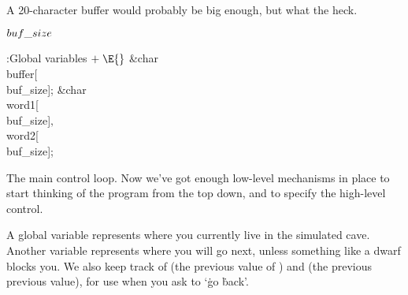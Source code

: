 A 20-character buffer would probably be big enough, but
what the heck.

\Y\B\4\D$\\{buf\_size}$ \5
\par
\Y\B\4:Global variables\X${}\mathrel+\E{}$\6
\&{char} \\{buffer}[\\{buf\_size}];\6
\&{char} \\{word1}[\\{buf\_size}]${},{}$ \\{word2}[\\{buf\_size}];\par
\fi

The main control loop. Now we've got enough low-level
mechanisms in
place to start thinking of the program from the top down, and to
specify the high-level control.

A global variable  represents where you currently live in the
simulated cave. Another variable  represents where you will
go next, unless something like a dwarf blocks you. We also keep
track of  (the previous value of ) and 
(the previous previous value), for use when you ask to `\.{go} \.{back}'.

